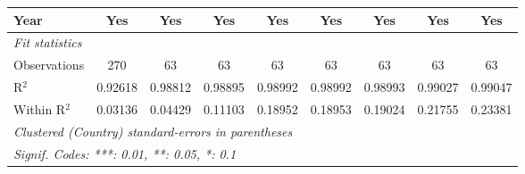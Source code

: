 \begin{table}[htbp]
\begin{tabular}{lcccccccc}
      Year                                                    & Yes             & Yes      & Yes      & Yes            & Yes            & Yes            & Yes            & Yes\\  
      \midrule
      \emph{Fit statistics}\\
      Observations                                            & 270             & 63       & 63       & 63             & 63             & 63             & 63             & 63\\  
      R$^2$                                                   & 0.92618         & 0.98812  & 0.98895  & 0.98992        & 0.98992        & 0.98993        & 0.99027        & 0.99047\\  
      Within R$^2$                                            & 0.03136         & 0.04429  & 0.11103  & 0.18952        & 0.18953        & 0.19024        & 0.21755        & 0.23381\\  
      \midrule \midrule
      \multicolumn{9}{l}{\emph{Clustered (Country) standard-errors in parentheses}}\\
      \multicolumn{9}{l}{\emph{Signif. Codes: ***: 0.01, **: 0.05, *: 0.1}}\\
   \end{tabular}
\end{table}


